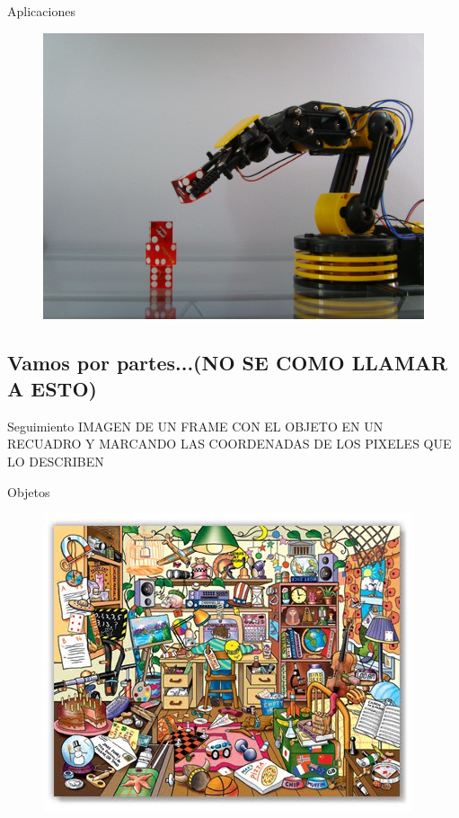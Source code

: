 \documentclass[]{beamer}
\begin{document}
\begin{frame}{Aplicaciones}
    \begin{figure}[t]
        \centering
        \includegraphics[scale=0.12]{img/robot.jpg}
    \end{figure}
\end{frame}

\subsection{Vamos por partes...(NO SE COMO LLAMAR A ESTO)}
\begin{frame}{Seguimiento}
    IMAGEN DE UN FRAME CON EL OBJETO EN UN RECUADRO Y MARCANDO LAS COORDENADAS
    DE LOS PIXELES QUE LO DESCRIBEN
\end{frame}



\begin{frame}{Objetos}
    \begin{figure}[t]
        \centering
        \includegraphics[scale=0.6]{img/escena_con_objetos.jpg}
    \end{figure}
\end{frame}
\end{document}
